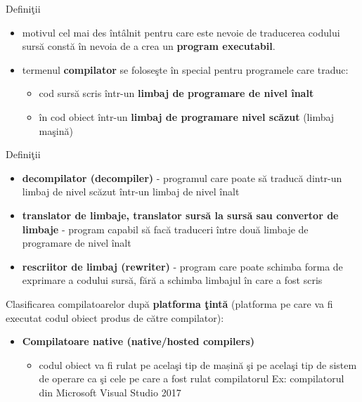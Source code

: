 \documentclass[pdf]{beamer}
\begin{document}
\begin{frame}{Definiţii}
\begin{itemize}
\item
motivul cel mai des întâlnit pentru care este nevoie de traducerea codului sursă constă în nevoia de a crea un \textbf{program executabil}.
\item
termenul \textbf{compilator} se foloseşte în special pentru programele care traduc:

\begin{itemize}
\item
cod sursă scris într-un \textbf{limbaj de programare de nivel înalt}
\item
în cod obiect într-un \textbf{limbaj de programare nivel scăzut} (limbaj maşină)
\end{itemize}
\end{itemize}
\end{frame}



\begin{frame}{Definiţii}
\begin{itemize}
\item
\textbf{decompilator (decompiler)} - programul care poate să traducă dintr-un limbaj de nivel scăzut într-un limbaj de nivel înalt
\item
\textbf{translator de limbaje, translator sursă la sursă sau convertor de limbaje} - program capabil să facă traduceri între două limbaje de programare de nivel înalt
\item
\textbf{rescriitor de limbaj (rewriter)} - program care poate schimba forma de exprimare a codului sursă, fără a schimba limbajul în care a fost scris
\end{itemize}
\end{frame}



\begin{frame}{Clasificarea compilatoarelor}
după \textbf{platforma ţintă} (platforma pe care va fi executat codul obiect produs de către compilator):

\begin{itemize}
\item
\textbf{Compilatoare native (native/hosted compilers)}

\begin{itemize}
\item
codul obiect va fi rulat pe acelaşi tip de mașină şi pe acelaşi tip de sistem de operare ca şi cele pe care a fost rulat compilatorul
\newline
Ex: compilatorul din Microsoft Visual Studio 2017
\end{itemize}
\end{itemize}
\end{frame}
\end{document}
